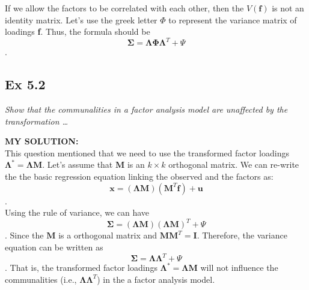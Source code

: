 \documentclass[
]{article}
\begin{document}
If we allow the factors to be correlated with each other, then the
\(V(\boldsymbol f)\) is not an identity matrix. Let's use the greek
letter \(\Phi\) to represent the variance matrix of loadings \textbf{f}.
Thus, the formula should be
\[\boldsymbol \Sigma = \boldsymbol\Lambda \boldsymbol \Phi \boldsymbol\Lambda^T + \Psi\].

\hypertarget{ex-5.2}{%
\subsection{Ex 5.2}\label{ex-5.2}}

\emph{Show that the communalities in a factor analysis model are
unaffected by the transformation \ldots{}}

\textbf{MY SOLUTION:}\\
This question mentioned that we need to use the transformed factor
loadings \(\boldsymbol \Lambda ^* = \boldsymbol \Lambda \boldsymbol M\).
Let's assume that \(\boldsymbol M\) is an \(k \times k\) orthogonal
matrix. We can re-write the the basic regression equation linking the
observed and the factors as:
\[\boldsymbol x=(\boldsymbol\Lambda \boldsymbol M)( \boldsymbol M^T \boldsymbol f) + \boldsymbol u\].\\
Using the rule of variance, we can have
\[\boldsymbol \Sigma = (\boldsymbol\Lambda \boldsymbol M)(\boldsymbol\Lambda \boldsymbol M)^T + \Psi\].
Since the \(\boldsymbol M\) is a orthogonal matrix and
\(\boldsymbol M \boldsymbol M^T = \boldsymbol I\). Therefore, the
variance equation can be written as
\[\boldsymbol \Sigma = \boldsymbol\Lambda \boldsymbol\Lambda^T + \Psi\].
That is, the transformed factor loadings
\(\boldsymbol \Lambda ^* = \boldsymbol \Lambda \boldsymbol M\) will not
influence the communalities (i.e.,
\(\boldsymbol\Lambda \boldsymbol\Lambda^T\)) in the a factor analysis
model.
\end{document}
